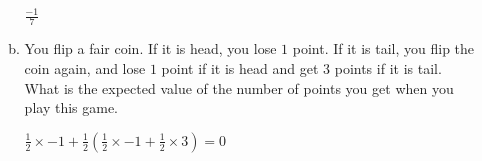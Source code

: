 \documentclass[12pt]{article}
\begin{document}
\begin{enumerate}
\begin{enumerate}[a.]
			$\frac{-1}{7}$
			\item You flip a fair coin. If it is head, you lose $1$ point. If it is tail, you flip the coin again, and lose $1$ point if it is head and get 3 points if it is tail. What is the expected value of the number of points you get when you play this game.

			$\frac{1}{2} \times -1 + \frac{1}{2}(\frac{1}{2}\times -1 + \frac{1}{2} \times 3) = 0$
		\end{enumerate}


	\end{enumerate}
\end{document}
